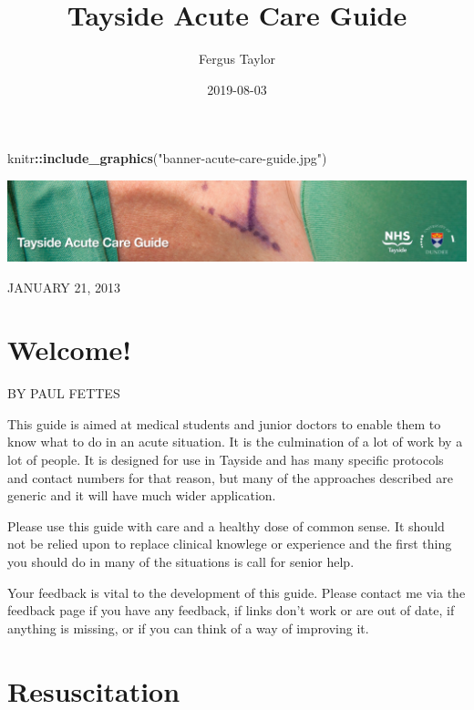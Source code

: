 \documentclass[]{book}
\title{Tayside Acute Care Guide}
\author{Fergus Taylor}
\date{2019-08-03}
\newenvironment{Shaded}{\begin{snugshade}}{\end{snugshade}}
\newcommand{\KeywordTok}[1]{\textcolor[rgb]{0.13,0.29,0.53}{\textbf{#1}}}
\newcommand{\NormalTok}[1]{#1}
\newcommand{\OperatorTok}[1]{\textcolor[rgb]{0.81,0.36,0.00}{\textbf{#1}}}
\newcommand{\StringTok}[1]{\textcolor[rgb]{0.31,0.60,0.02}{#1}}
\begin{document}
\maketitle

{
\setcounter{tocdepth}{1}
\tableofcontents
}
\begin{Shaded}
\begin{Highlighting}[]
\NormalTok{knitr}\OperatorTok{::}\KeywordTok{include_graphics}\NormalTok{(}\StringTok{"banner-acute-care-guide.jpg"}\NormalTok{)}
\end{Highlighting}
\end{Shaded}

\includegraphics[width=1\linewidth]{banner-acute-care-guide}

JANUARY 21, 2013

\hypertarget{welcome}{%
\chapter*{Welcome!}\label{welcome}}

BY PAUL FETTES

This guide is aimed at medical students and junior doctors to enable them to know what to do in an acute situation. It is the culmination of a lot of work by a lot of people. It is designed for use in Tayside and has many specific protocols and contact numbers for that reason, but many of the approaches described are generic and it will have much wider application.

Please use this guide with care and a healthy dose of common sense. It should not be relied upon to replace clinical knowlege or experience and the first thing you should do in many of the situations is call for senior help.

Your feedback is vital to the development of this guide.
Please contact me via the feedback page if you have any feedback, if links don't work or are out of date, if anything is missing, or if you can think of a way of improving it.

\hypertarget{resuscitation}{%
\chapter{Resuscitation}\label{resuscitation}}
\end{document}
